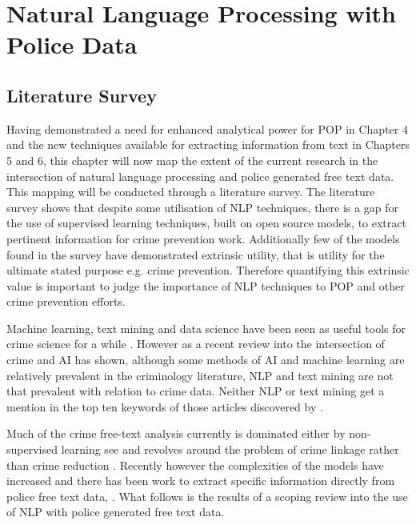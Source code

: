 \chapter{ Natural Language Processing with Police Data}

\section{Literature Survey}

Having demonstrated a need for enhanced analytical power for POP in Chapter 4 and the new techniques available for extracting information from text in Chapters 5 and 6, this chapter will now map the extent of the current research in the intersection of natural language processing and police generated free text data. This mapping will be conducted through a literature survey. The literature survey shows that despite some utilisation of NLP techniques, there is a gap for the use of supervised learning techniques, built on open source models, to extract pertinent information for crime prevention work. Additionally few of the models found in the survey have demonstrated extrinsic utility, that is utility for the ultimate stated purpose e.g. crime prevention.  Therefore quantifying this extrinsic value is important to judge the importance of NLP techniques to POP and other crime prevention efforts.

Machine learning, text mining and data science have been seen as useful tools for crime science for a while \parencite{marshall2006needles}. However as a recent review into the intersection of crime and AI has shown\parencite{campedelli2019we}, although some methods of AI and machine learning are relatively prevalent in the criminology  literature, NLP and text mining are not that prevalent with relation to crime data. Neither NLP or text mining  get a mention in the top ten keywords of those articles discovered by \textcite{campedelli2019we}. 

Much of the crime free-text analysis currently is dominated either by non-supervised learning see \parencite{kuang2017crime, seo2018partially, birks2020unsupervised} and revolves around the problem of crime linkage rather than crime reduction \parencite{hassani2016review}. Recently however the complexities of the models have increased and there has been work to extract specific information directly from police free text data, \parencite{karystianis2018automatic, karystianis2019automated}.  What follows is the results of a scoping review \parencite{arksey2005scoping} into the use of NLP with police generated free text data. 

